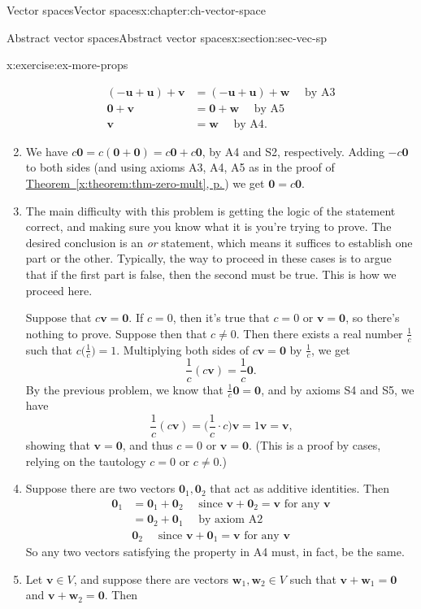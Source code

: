 \documentclass[oneside,10pt,]{book}
\newcommand{\xreffont}{\relax}
\numberwithin{equation}{section}
\newcommand{\uu}{\mathbf{u}}
\newcommand{\vv}{\mathbf{v}}
\newcommand{\ww}{\mathbf{w}}
\newcommand{\zer}{\mathbf{0}}
\newcommand{\amp}{&}
\begin{document}
\begin{chapterptx}{Vector spaces}{}{Vector spaces}{}{}{x:chapter:ch-vector-space}
\begin{sectionptx}{Abstract vector spaces}{}{Abstract vector spaces}{}{}{x:section:sec-vec-sp}
\begin{inlineexercise}{}{x:exercise:ex-more-props}
\begin{enumerate}
\begin{align*}
(-\uu+\uu)+\vv \amp =(-\uu+\uu)+\ww \quad \text{ by A3}\\
\zer+\vv \amp =\zer+\ww \quad \text{ by A5}\\
\vv \amp =\ww \quad \text{ by A4}\text{.}
\end{align*}
%
\item{}We have \(c\zer = c(\zer+\zer) = c\zer +c\zer\), by A4 and S2, respectively. Adding \(-c\zer\) to both sides (and using axioms A3, A4, A5 as in the proof of \hyperref[x:theorem:thm-zero-mult]{Theorem~{\xreffont\ref{x:theorem:thm-zero-mult}}, p.\,\pageref{x:theorem:thm-zero-mult}}) we get \(\zer = c\zer\).%
\item{}The main difficulty with this problem is getting the logic of the statement correct, and making sure you know what it is you're trying to prove. The desired conclusion is an \emph{or} statement, which means it suffices to establish one part or the other. Typically, the way to proceed in these cases is to argue that if the first part is false, then the second must be true. This is how we proceed here.%
\par
Suppose that \(c\vv=\zer\). If \(c=0\), then it's true that \(c=0\) or \(\vv=\zer\), so there's nothing to prove. Suppose then that \(c\neq 0\). Then there exists a real number \(\frac1c\) such that \(c\bigl(\frac1c\bigr)=1\). Multiplying both sides of \(c\vv=\zer\) by \(\frac1c\), we get%
\begin{equation*}
\frac1c(c\vv)=\frac1c\zer\text{.}
\end{equation*}
By the previous problem, we know that \(\frac1c\zer = \zer\), and by axioms S4 and S5, we have%
\begin{equation*}
\frac1c(c\vv)=\bigl(\frac1c\cdot c\bigr)\vv = 1\vv = \vv\text{,}
\end{equation*}
showing that \(\vv=\zer\), and thus \(c=0\) or \(\vv=\zer\). (This is a proof by cases, relying on the tautology \(c=0\) or \(c\neq 0\).)%
\item{}Suppose there are two vectors \(\zer_1,\zer_2\) that act as additive identities. Then%
\begin{align*}
\zer_1 \amp = \zer_1+\zer_2 \quad \text{ since } \vv+\zer_2=\vv \text{ for any } \vv\\
\amp =\zer_2+\zer_1 \quad \text{ by axiom A2}\\
\amp \zer_2 \quad \text{ since } \vv+\zer_1=\vv \text{ for any } \vv
\end{align*}
So any two vectors satisfying the property in A4 must, in fact, be the same.%
\item{}Let \(\vv\in V\), and suppose there are vectors \(\ww_1,\ww_2\in V\) such that \(\vv+\ww_1=\zer\) and \(\vv+\ww_2=\zer\). Then%

\end{enumerate}
\end{inlineexercise}
\end{sectionptx}
\end{chapterptx}
\end{document}
